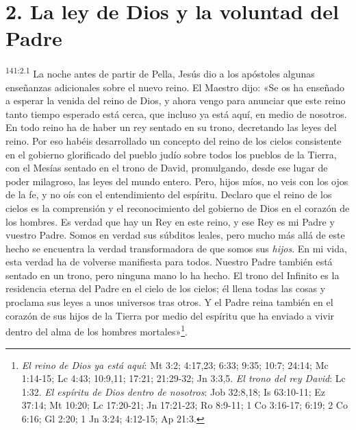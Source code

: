 \section*{2. La ley de Dios y la voluntad del Padre}
\par 
\textsuperscript{141:2.1} La noche antes de partir de Pella, Jesús dio a los apóstoles algunas enseñanzas adicionales sobre el nuevo reino. El Maestro dijo: «Se os ha enseñado a esperar la venida del reino de Dios, y ahora vengo para anunciar que este reino tanto tiempo esperado está cerca, que incluso ya está aquí, en medio de nosotros. En todo reino ha de haber un rey sentado en su trono, decretando las leyes del reino. Por eso habéis desarrollado un concepto del reino de los cielos consistente en el gobierno glorificado del pueblo judío sobre todos los pueblos de la Tierra, con el Mesías sentado en el trono de David, promulgando, desde ese lugar de poder milagroso, las leyes del mundo entero. Pero, hijos míos, no veis con los ojos de la fe, y no oís con el entendimiento del espíritu. Declaro que el reino de los cielos es la comprensión y el reconocimiento del gobierno de Dios en el corazón de los hombres. Es verdad que hay un Rey en este reino, y ese Rey es mi Padre y vuestro Padre. Somos en verdad sus súbditos leales, pero mucho más allá de este hecho se encuentra la verdad transformadora de que somos sus \textit{hijos}. En mi vida, esta verdad ha de volverse manifiesta para todos. Nuestro Padre también está sentado en un trono, pero ninguna mano lo ha hecho. El trono del Infinito es la residencia eterna del Padre en el cielo de los cielos; él llena todas las cosas y proclama sus leyes a unos universos tras otros. Y el Padre reina también en el corazón de sus hijos de la Tierra por medio del espíritu que ha enviado a vivir dentro del alma de los hombres mortales»\footnote{\textit{El reino de Dios ya está aquí}: Mt 3:2; 4:17,23; 6:33; 9:35; 10:7; 24:14; Mc 1:14-15; Lc 4:43; 10:9,11; 17:21; 21:29-32; Jn 3:3,5. \textit{El trono del rey David}: Lc 1:32. \textit{El espíritu de Dios dentro de nosotros}: Job 32:8,18; Is 63:10-11; Ez 37:14; Mt 10:20; Lc 17:20-21; Jn 17:21-23; Ro 8:9-11; 1 Co 3:16-17; 6:19; 2 Co 6:16; Gl 2:20; 1 Jn 3:24; 4:12-15; Ap 21:3.}.

